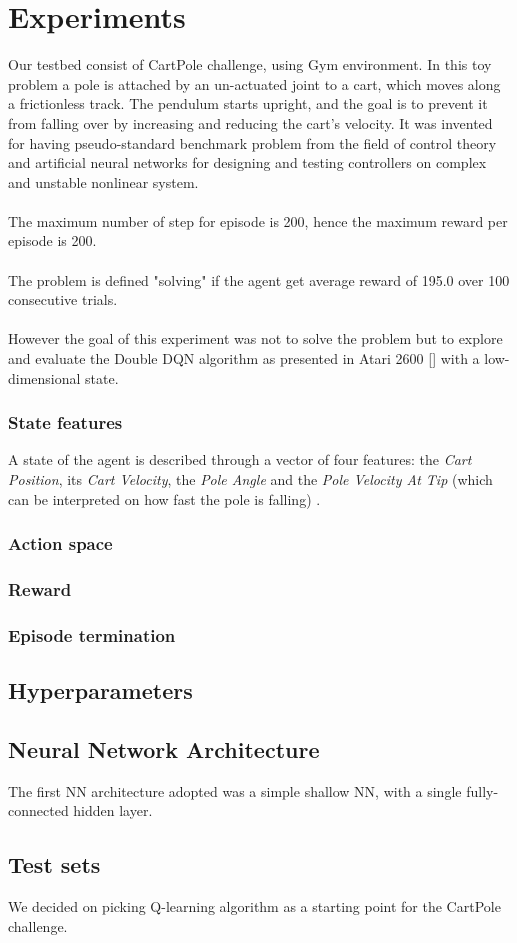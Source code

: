 \section{Experiments}

Our testbed consist of CartPole challenge, using Gym environment.
In this toy problem a pole is attached by an un-actuated joint to a cart, which moves along a frictionless track. The pendulum starts upright, and the goal is to prevent it from falling over by increasing and reducing the cart's velocity. It was invented for having pseudo-standard benchmark problem from the field of control theory and artificial neural networks for designing and testing controllers on complex and unstable nonlinear system.
\\\\The maximum number of step for episode is 200, hence the maximum reward per episode is 200.
\\\\The problem is defined "solving" if the agent get average reward of 195.0 over 100 consecutive trials. 
\\\\However the goal of this experiment was not to solve the problem but to explore and evaluate the Double DQN algorithm as presented in Atari 2600 [] with a low-dimensional state.
 
\subsubsection{State features}

A state of the agent is described through a vector of four features: the  \textit{Cart Position}, its \textit{Cart Velocity}, the \textit{Pole Angle} and the \textit{Pole Velocity At Tip} (which can be interpreted on how fast the pole is falling) .

\subsubsection{Action space}
\subsubsection{Reward}
\subsubsection{Episode termination}

\subsection{Hyperparameters}

\subsection{Neural Network Architecture}

The first NN architecture adopted was a simple shallow NN, with a single fully-connected hidden layer.

\subsection{Test sets}

We decided on picking Q-learning algorithm as a starting point for the CartPole challenge.


